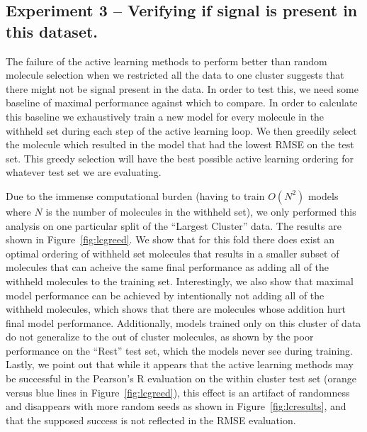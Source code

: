 \documentclass[journal=jmcmar,manuscript=article]{achemso}
\begin{document}
\subsection{Experiment 3 -- Verifying if signal is present in this dataset.}
The failure of the active learning methods to perform better than random molecule selection when we restricted all the data to one cluster suggests that there might not be signal present in the data. In order to test this, we need some baseline of maximal performance against which to compare. In order to calculate this baseline we exhaustively train a new model for every molecule in the withheld set during each step of the active learning loop. We then greedily select the molecule which resulted in the model that had the lowest RMSE on the test set. This greedy selection will have the best possible active learning ordering for whatever test set we are evaluating.

Due to the immense computational burden (having to train $O(N^2)$ models where $N$ is the number of molecules in the withheld set), we only performed this analysis on one particular split of the ``Largest Cluster'' data. The results are shown in Figure~\ref{fig:lcgreed}. We show that for this fold there does exist an optimal ordering of withheld set molecules that results in a smaller subset of molecules that can acheive the same final performance as adding all of the withheld molecules to the training set. Interestingly, we also show that maximal model performance can be achieved by intentionally not adding all of the withheld molecules, which shows that there are molecules whose addition hurt final model performance. Additionally, models trained only on this cluster of data do not generalize to the out of cluster molecules, as shown by the poor performance on the ``Rest'' test set, which the models never see during training. Lastly, we point out that while it appears that the active learning methods may be successful in the Pearson's R evaluation on the within cluster test set (orange versus blue lines in Figure~\ref{fig:lcgreed}), this effect is an artifact of randomness and disappears with more random seeds as shown in Figure~\ref{fig:lcresults}, and that the supposed success is not reflected in the RMSE evaluation.
\end{document}
